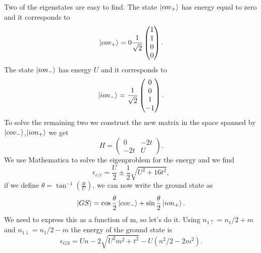 \begin{questions}
\begin{solution}
Two of the eigenstates are easy to find.
The state $\ket{cov_+}$ has energy equal to zero and it corresponds to
\begin{equation}
     \ket{cov_+} = 0 \frac{1}{\sqrt{2}}\begin{pmatrix}
      1 \\
       1 \\
        0 \\
         0
  \end{pmatrix}.
\end{equation}
The state $\ket{ion_-}$ has energy $U$ and it corresponds to
\begin{equation}
  \ket{ion_-} = \frac{1}{\sqrt{2}}\begin{pmatrix}
    0 \\ 0 \\ 1 \\ -1
\end{pmatrix}.
\end{equation}
To solve the remaining two we construct the new matrix in the space spanned by $\ket{cov_-}$,$\ket{ion_+}$
we get
\begin{equation}
  H = \begin{pmatrix}
    0 & -2t \\
    -2t & U
\end{pmatrix}.
\end{equation}
We use Mathematica to solve the eigenproblem for the energy and we find
\begin{equation}
  \epsilon_{c/i} = \frac{U}{2} \pm \frac{1}{2}\sqrt{U^2 + 16t^2},
  \label{en}
\end{equation}
if we define $\theta = \tan^{-1} \left( \frac{4t}{U}\right)$, we can now write the ground state as
\begin{equation}
  \ket{GS} = \cos \frac{\theta}{2} \ket{cov_-} + \sin \frac{\theta}{2} \ket{ion_+}.
\end{equation}
We need to express this as a function of m, so let's do it. Using $n_{1\uparrow} = n_1/2 + m$ and $n_{1\downarrow} = n_1/2 - m$ the energy of the ground state is
\begin{equation}
  \epsilon_{GS} = Un - 2\sqrt{U^2 m^2 + t^2}- U(n^2/2 - 2m^2).
\end{equation}


\end{solution}
\end{questions}
